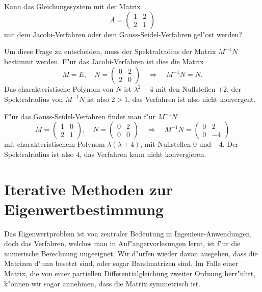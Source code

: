 \begin{beispiel}
Kann das Gleichungssystem mit der Matrix 
\[
A=\begin{pmatrix}1&2\\2&1\end{pmatrix}
\]
mit dem Jacobi-Verfahren oder dem Gauss-Seidel-Verfahren gel"ost werden?

Um diese Frage zu entscheiden, muss der Spektralradius der
Matrix $M^{-1}N$ bestimmt werden.
F"ur das Jacobi-Verfahren ist dies die Matrix
\[
M=E,\quad  N=\begin{pmatrix}0&2\\2&0\end{pmatrix}\quad
\Rightarrow
\quad
M^{-1}N=N.
\]
Das charakteristische Polynom von $N$ ist $\lambda^2-4$ mit den
Nullstellen $\pm2$, der Spektralradius von $M^{-1}N$ ist also $2> 1$,
das Verfahren ist also nicht konvergent.

F"ur das Gauss-Seidel-Verfahren findet man f"ur $M^{-1}N$
\[
M=\begin{pmatrix}1&0\\2&1\end{pmatrix},\quad
N=\begin{pmatrix}0&2\\0&0\end{pmatrix}\quad
\Rightarrow
\quad
M^{-1}N=\begin{pmatrix}0&2\\0&-4\end{pmatrix}
\]
mit charakteristischem Polynom $\lambda(\lambda+4)$, mit Nullstellen
$0$ und $-4$. Der Spektralradius ist also $4$, das Verfahren kann nicht
konvergieren.
\end{beispiel}



\section{Iterative Methoden zur Eigenwertbestimmung}
Das Eigenwertproblem ist von zentraler Bedeutung in Ingenieur-Anwendungen,
doch das Verfahren, welches man in Anf"angervorlesungen lernt, ist f"ur die
numerische Berechnung ungeeignet.
Wir d"urfen wieder davon ausgehen, dass die Matrizen d"unn besetzt sind, oder
sogar Bandmatrizen sind.
Im Falle einer Matrix, die von einer partiellen Differentialgleichung
zweiter Ordnung herr"uhrt, k"onnen wir sogar annehmen, dass die
Matrix symmetrisch ist.

